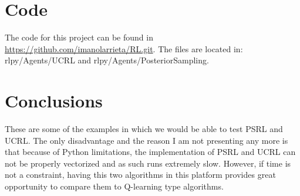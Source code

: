 \documentclass[12pt]{article}
\begin{document}
\section{Code}
The code for this project can be found in \url{https://github.com/imanolarrieta/RL.git}. The files are located in: rlpy/Agents/UCRL and rlpy/Agents/PosteriorSampling.

\section{Conclusions}
These are some of the examples in which we would be able to test PSRL and UCRL. The only disadvantage and the reason I am not presenting any more is that because of Python limitations, the implementation of PSRL and UCRL can not be properly vectorized and as such runs extremely slow. However, if time is not a constraint, having this two algorithms in this platform provides great opportunity to compare them to Q-learning type algorithms.
\newpage



\end{document}
